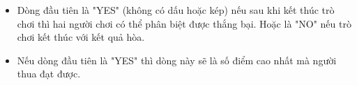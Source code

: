 \begin{itemize}
	\item     Dòng đầu tiên là "YES" (không có dấu hoặc kép) nếu sau khi kết thúc trò chơi thì hai người chơi có thể phân biệt được thắng bại. Hoặc là "NO" nếu trò chơi kết thúc với kết quả hòa.   
	\item     Nếu dòng đầu tiên là "YES" thì dòng này sẽ là số điểm cao nhất mà người         thua        đạt được.   
\end{itemize}